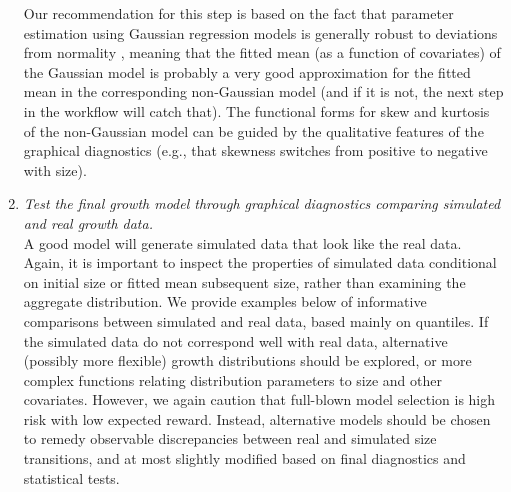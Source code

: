 \documentclass[12pt]{article}
\begin{document}
\begin{enumerate}[label=\arabic*., listparindent=1.5em]
Our recommendation for this step is based on the fact that parameter estimation using Gaussian regression models is generally robust to deviations from normality \citep{schielzeth2020robustness}, meaning that the fitted mean (as a function of covariates) of the Gaussian model is probably a very good approximation for the fitted mean in the corresponding non-Gaussian model (and if it is not, the next step in the workflow will catch that). 
The functional forms for skew and kurtosis of the non-Gaussian model can be guided by the qualitative features of the graphical diagnostics (e.g., that skewness switches from positive to negative with size). 

\item \textit{Test the final growth model through graphical diagnostics comparing simulated and real growth data.} 
\\
A good model will generate simulated data that look like the real data.  
Again, it is important to inspect the properties of simulated data conditional on initial size or fitted mean subsequent size, rather than examining the aggregate distribution.   
We provide examples below of informative comparisons between simulated and real data, based mainly on quantiles. 
If the simulated data do not correspond well with real data, alternative (possibly more flexible) growth distributions should be explored, or more complex functions relating distribution parameters to size and other covariates. 
However, we again caution that full-blown model selection is high risk with low expected reward. 
Instead, alternative models should be chosen to remedy observable discrepancies between real and simulated size transitions, and at most slightly modified based on final diagnostics and statistical tests.

\end{enumerate}
\end{document}
